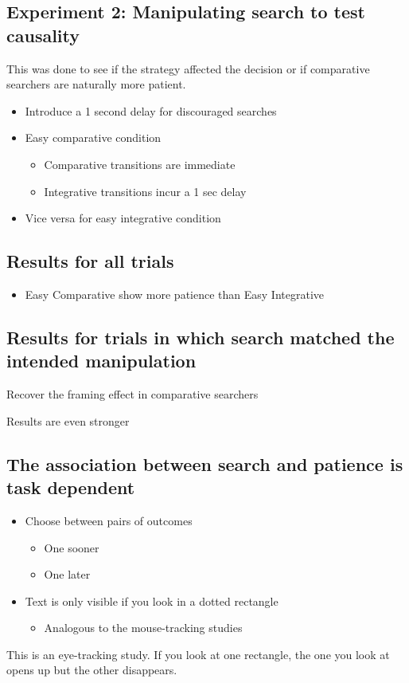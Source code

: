 \subsection{Experiment 2: Manipulating search to test causality}
This was done to see if the strategy affected the decision or if comparative searchers are naturally more patient.
\begin{itemize}
    \item Introduce a 1 second delay for discouraged searches
    \item Easy comparative condition
    \begin{itemize}
        \item Comparative transitions are immediate
        \item Integrative transitions incur a 1 sec delay
    \end{itemize}
    \item Vice versa for easy integrative condition
\end{itemize}
\subsection{Results for all trials}
\begin{itemize}
    \item Easy Comparative show more patience than Easy Integrative
\end{itemize}
\subsection{Results for trials in which search matched the intended manipulation}
\item Recover the framing effect in comparative searchers
\item Results are even stronger
\subsection{The association between search and patience is task dependent}
\begin{itemize}
    \item Choose between pairs of outcomes
    \begin{itemize}
        \item One sooner
        \item One later
        
    \end{itemize}
    \item Text is only visible if you look in a dotted rectangle
    \begin{itemize}
        \item Analogous to the mouse-tracking studies
    \end{itemize}

\end{itemize}
This is an eye-tracking study. If you look at one rectangle, the one you look at opens up but the other disappears.
